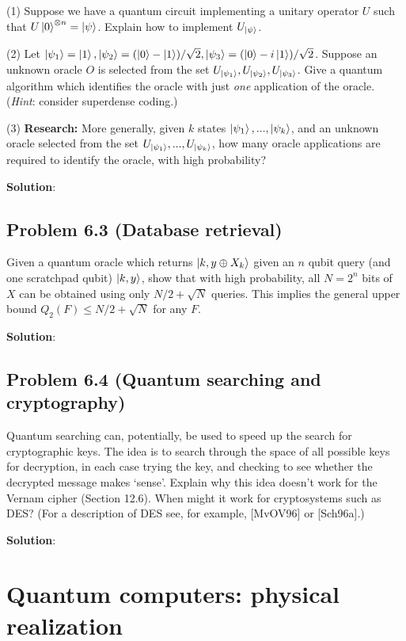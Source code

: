 \documentclass{book}
\begin{document}
        (1) Suppose we have a quantum circuit implementing a unitary operator $U$ such that $U\ket{0}^{\otimes n} = \ket{\psi}$. Explain how to implement $U_{\ket{\psi}}$. \par
        (2) Let $\ket{\psi_1}=\ket{1}, \ket{\psi_2} = (\ket{0}-\ket{1})/\sqrt{2}, \ket{\psi_3}=(\ket{0}-i\ket{1})/\sqrt{2}$. Suppose an unknown oracle $O$ is selected from the set $U_{\ket{\psi_1}}, U_{\ket{\psi_2}}, U_{\ket{\psi_3}}$. Give a quantum algorithm which identifies the oracle with just \emph{one} application of the oracle. (\emph{Hint}: consider superdense coding.) \par
        (3) \textbf{Research:} More generally, given $k$ states $\ket{\psi_1},...,\ket{\psi_k}$, and an unknown oracle selected from the set $U_{\ket{\psi_1}},...,U_{\ket{\psi_k}}$, how many oracle applications are required to identify the oracle, with high probability?
        
        \textbf{Solution}:
    
    \section*{Problem 6.3 (Database retrieval)}
        Given a quantum oracle which returns $\ket{k,y\oplus X_k}$ given an $n$ qubit query (and one scratchpad qubit) $\ket{k,y}$, show that with high probability, all $N=2^n$ bits of $X$ can be obtained using only $N/2 + \sqrt{N}$ queries. This implies the general upper bound $Q_2(F) \leq N/2 +\sqrt{N}$ for any $F$.
        
        \textbf{Solution}:
    
    \section*{Problem 6.4 (Quantum searching and cryptography)}
        Quantum searching can, potentially, be used to speed up the search for cryptographic keys. The idea is to search through the space of all possible keys for decryption, in each case trying the key, and checking to see whether the decrypted message makes ‘sense’. Explain why this idea doesn’t work for the Vernam cipher (Section 12.6). When might it work for cryptosystems such as DES? (For a description of DES see, for example, [MvOV96] or [Sch96a].)
        
        \textbf{Solution}:

\chapter{Quantum computers: physical realization}
\end{document}

